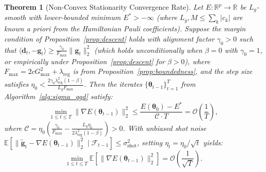 \documentclass[sn-mathphys,Numbered]{sn-jnl}
\theoremstyle{thmstyleone}
\newtheorem{theorem}{Theorem}
\theoremstyle{thmstyletwo}
\theoremstyle{thmstylethree}
\begin{document}
\begin{theorem}[Non-Convex Stationarity Convergence Rate]
\label{thm:convergence}
Let $E: \mathbb{R}^p \to \mathbb{R}$ be $L_g$-smooth with lower-bounded minimum $E^* > -\infty$ (where $L_g, M \le \sum_k |c_k|$ are known a priori from the Hamiltonian Pauli coefficients). Suppose the margin condition of Proposition~\ref{prop:descent} holds with alignment factor $\gamma_0 > 0$ such that $\langle \mathbf{d}_t, -\mathbf{g}_t \rangle \ge \frac{\gamma_0}{F_{\max}} \|\mathbf{g}_t\|_2^2$ (which holds unconditionally when $\beta = 0$ with $\gamma_0 = 1$, or empirically under Proposition~\ref{prop:descent} for $\beta > 0$), where $F_{\max} = 2c G_{\max}^2 + \lambda_{\text{reg}}$ is from Proposition~\ref{prop:boundedness}, and the step size satisfies $\eta_0 < \frac{2\gamma_0 \lambda_{\text{reg}}^2 (1-\beta)}{L_g F_{\max}}$. Then the iterates $\{\boldsymbol{\theta}_{t-1}\}_{t=1}^T$ from Algorithm~\ref{alg:sigma_qgd} satisfy:
\begin{equation}
\min_{1 \le t \le T} \|\nabla E(\boldsymbol{\theta}_{t-1})\|_2^2 \le \frac{E(\boldsymbol{\theta}_0) - E^*}{\mathcal{C} \cdot T} = \mathcal{O}\left(\frac{1}{T}\right),
\label{eq:ergodic_rate}
\end{equation}
where $\mathcal{C} = \eta_0 \left( \frac{\gamma_0}{F_{\max}} - \frac{L_g \eta_0}{2 \lambda_{\text{reg}}^2 (1-\beta)} \right) > 0$. With unbiased shot noise $\mathbb{E}[\|\tilde{\mathbf{g}}_t - \nabla E(\boldsymbol{\theta}_{t-1})\|_2^2 \mid \mathcal{F}_{t-1}] \le \sigma_{\text{shot}}^2$, setting $\eta_t = \eta_0 / \sqrt{t}$ yields:
\begin{equation}
\min_{1 \le t \le T} \mathbb{E}\left[\|\nabla E(\boldsymbol{\theta}_{t-1})\|_2^2\right] = \mathcal{O}\left(\frac{1}{\sqrt{T}}\right).
\label{eq:stochastic_rate}
\end{equation}
\end{theorem}
\end{document}
